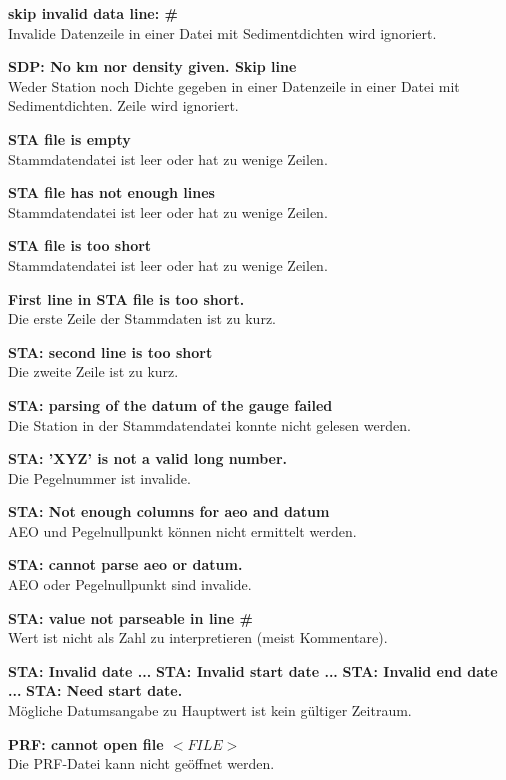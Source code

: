 \textbf{skip invalid data line: \#}
\\Invalide Datenzeile in einer Datei mit Sedimentdichten wird ignoriert.

\textbf{SDP: No km nor density given. Skip line}
\\Weder Station noch Dichte gegeben in einer Datenzeile in einer Datei mit Sedimentdichten.
Zeile wird ignoriert.

\textbf{STA file is empty}
\\Stammdatendatei ist leer oder hat zu wenige Zeilen.

\textbf{STA file has not enough lines}
\\Stammdatendatei ist leer oder hat zu wenige Zeilen.

\textbf{STA file is too short}
\\Stammdatendatei ist leer oder hat zu wenige Zeilen.

\textbf{First line in STA file is too short.}
\\Die erste Zeile der Stammdaten ist zu kurz.

\textbf{STA: second line is too short}
\\Die zweite Zeile ist zu kurz.

\textbf{STA: parsing of the datum of the gauge failed}
\\Die Station in der Stammdatendatei konnte nicht gelesen werden.

\textbf{STA: 'XYZ' is not a valid long number.}
\\Die Pegelnummer ist invalide.

\textbf{STA: Not enough columns for aeo and datum}
\\AEO und Pegelnullpunkt können nicht ermittelt werden.

\textbf{STA: cannot parse aeo or datum.}
\\AEO oder Pegelnullpunkt sind invalide.

\textbf{STA: value not parseable in line \#}
\\Wert ist nicht als Zahl zu interpretieren (meist Kommentare).

\textbf{STA: Invalid date ...}
\textbf{STA: Invalid start date ...}
\textbf{STA: Invalid end date ...}
\textbf{STA: Need start date.}
\\Mögliche Datumsangabe zu Hauptwert ist kein gültiger Zeitraum.

\textbf{PRF: cannot open file $<FILE>$}
\\Die PRF-Datei kann nicht geöffnet werden.

